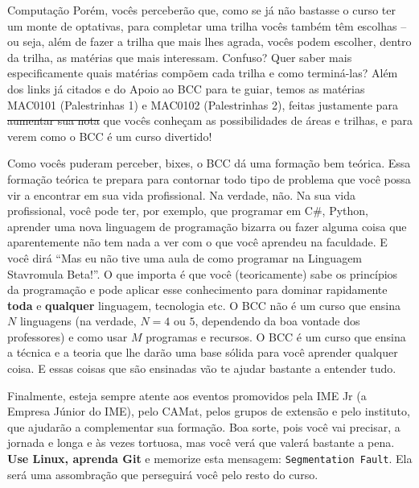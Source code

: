 \begin{subsecao}{Computação}
Porém, vocês perceberão que, como se já não bastasse o curso ter um monte de
optativas, para completar uma trilha vocês também têm escolhas -- ou seja,
além de fazer a trilha que mais lhes agrada, vocês podem escolher, dentro da
trilha, as matérias que mais interessam. Confuso? Quer saber mais
especificamente quais matérias compõem cada trilha e como terminá-las? Além
dos links já citados e do Apoio ao BCC para te guiar, temos as matérias MAC0101
(Palestrinhas 1) e MAC0102 (Palestrinhas 2), feitas justamente para
\sout{aumentar sua nota} que vocês conheçam as possibilidades de áreas e
trilhas, e para verem como o BCC é um curso divertido!

Como vocês puderam perceber, bixes, o BCC dá uma formação bem teórica. Essa
formação teórica te prepara para contornar todo tipo de problema que você
possa vir a encontrar em sua vida profissional. Na verdade, não. Na sua vida
profissional, você pode ter, por exemplo, que programar em C\#, Python,
aprender uma nova linguagem de programação bizarra ou fazer alguma coisa que
aparentemente não tem nada a ver com o que você aprendeu na faculdade. E você
dirá ``Mas eu não tive uma aula de como programar na Linguagem Stavromula
Beta!''. O que importa é que você (teoricamente) sabe os princípios da
programação e pode aplicar esse conhecimento para dominar rapidamente \textbf{toda}
e \textbf{qualquer} linguagem, tecnologia etc. O BCC não é um curso que ensina $N$
linguagens (na verdade, $N = 4$ ou $5$, dependendo da boa vontade dos
professores) e como usar $M$ programas e recursos. O BCC é um curso que ensina
a técnica e a teoria que lhe darão uma base sólida para você aprender qualquer
coisa. E essas coisas que são ensinadas vão te ajudar bastante a entender tudo.

Finalmente, esteja sempre atente aos eventos promovidos pela IME Jr (a Empresa Júnior do IME),
pelo CAMat, pelos grupos de extensão e pelo instituto, que ajudarão a
complementar sua formação. Boa sorte, pois você vai precisar, a jornada e longa e às vezes tortuosa, mas você verá que valerá bastante a pena. \textbf{Use
Linux, aprenda Git} e memorize esta mensagem: \texttt{Segmentation Fault}. Ela será
uma assombração que perseguirá você pelo resto do curso.


\end{subsecao}
